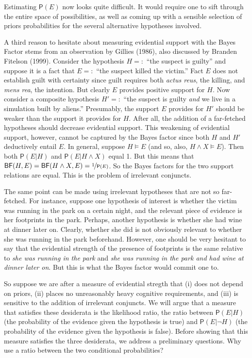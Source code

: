 \documentclass[
  10pt,
  dvipsnames,enabledeprecatedfontcommands]{scrartcl}
\newcommand{\et}{\wedge}
\newcommand{\pr}[1]{\mathsf{P}(#1)}
\begin{document}
\noindent Estimating \(\pr{E}\) now looks quite difficult. It would
require one to sift through the entire space of possibilities, as well
as coming up with a sensible selection of priors probabilities for the
several alternative hypotheses involved.

A third reason to hesitate about measuring evidential support with the
Bayes Factor stems from an observation by Gillies (1986), also discussed
by Branden Fitelson (1999). Consider the hypothesis \(H =:\) ``the
suspect is guilty'' and suppose it is a fact that \(E =:\) ``the suspect
killed the victim.'' Fact \(E\) does not establish guilt with certainty
since guilt requires both \emph{actus reus}, the killing, and
\emph{mens rea}, the intention. But clearly \(E\) provides positive
support for \(H\). Now consider a composite hypothesis \(H'=:\) ``the
suspect is guilty \textit{and} we live in a simulation built by
aliens.'' Presumably, the support \(E\) provides for \(H'\) should be
weaker than the support it provides for \(H\). After all, the addition
of a far-fetched hypotheses should decrease evidential support. This
weakening of evidential support, however, cannot be captured by the
Bayes factor since both \(H\) and \(H'\) deductively entail \(E\). In
general, suppose \(H\models E\) (and so, also, \(H \et X \models E\)).
Then both \(\pr{E\vert H}\) and \(\pr{E \vert H \et X}\) equal 1. But
this means that
\(\mathsf{BF}(H,E) = \mathsf{BF}(H \et X, E) = \nicefrac{1}{\pr{E}}\).
So the Bayes factors for the two support relations are equal. This is
the problem of irrelevant conjuncts.

The same point can be made using irrelevant hypotheses that are not so
far-fetched. For instance, suppose one hypothesis of interest is whether
the victim was running in the park on a certain night, and the relevant
piece of evidence is her footprints in the park. Perhaps, another
hypothesis is whether she had wine at dinner later on. Clearly, whether
she did is not obviously relevant to whether she was running in the park
beforehand. However, one should be very hesitant to say that the
evidential strength of the presence of footprints is the same relative
to \emph{she was running in the park} and
\emph{she was running in the park and had wine at dinner later on}. But
this is what the Bayes factor would commit one to.

So suppose we are after a measure of evidential stregth that (i) does
not depend on priors, (ii) places no unreasonably heavy cognitive
requirements, and (iii) is sensitive to the addition of irrelevant
conjuncts. We will argue that a measure that satisfies these desiderata
is the likelihood ratio, the ratio between \(\pr{E \vert H}\) (the
probability of the evidence given the hypothesis is true) and
\(\pr{E \vert \neg H}\) (the probability of the evidence given the
hypothesis is false). Before showing that this measure satisfies the
three desiderata, we address a preliminary questions. Why use a ratio
between the two conditional probabilities?
\end{document}

